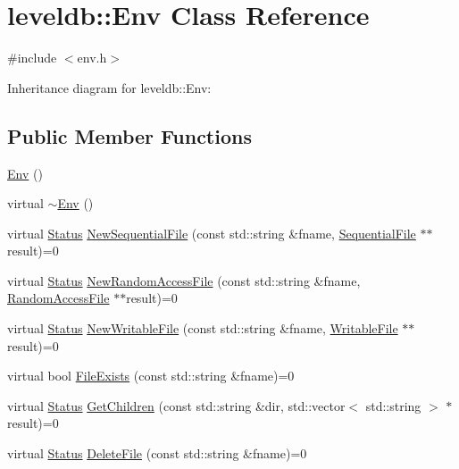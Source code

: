 \hypertarget{classleveldb_1_1_env}{\section{leveldb\-:\-:Env Class Reference}
\label{classleveldb_1_1_env}
}


{\ttfamily \#include $<$env.\-h$>$}



Inheritance diagram for leveldb\-:\-:Env\-:
\subsection*{Public Member Functions}
\begin{DoxyCompactItemize}
\item 
\hyperlink{classleveldb_1_1_env_a90f3648c740e3f5901f5843cd0dd07c4}{Env} ()
\item 
virtual \hyperlink{classleveldb_1_1_env_a2b9321c6176f8824b3ba65f0a36453fe}{$\sim$\-Env} ()
\item 
virtual \hyperlink{classleveldb_1_1_status}{Status} \hyperlink{classleveldb_1_1_env_ad73810059f48c1d7b91125d357e7d351}{New\-Sequential\-File} (const std\-::string \&fname, \hyperlink{classleveldb_1_1_sequential_file}{Sequential\-File} $\ast$$\ast$result)=0
\item 
virtual \hyperlink{classleveldb_1_1_status}{Status} \hyperlink{classleveldb_1_1_env_a1df3e0bb2d47ee914448df9bb9ca0734}{New\-Random\-Access\-File} (const std\-::string \&fname, \hyperlink{classleveldb_1_1_random_access_file}{Random\-Access\-File} $\ast$$\ast$result)=0
\item 
virtual \hyperlink{classleveldb_1_1_status}{Status} \hyperlink{classleveldb_1_1_env_a4566194f3e82fede425fdb5bb355f7de}{New\-Writable\-File} (const std\-::string \&fname, \hyperlink{classleveldb_1_1_writable_file}{Writable\-File} $\ast$$\ast$result)=0
\item 
virtual bool \hyperlink{classleveldb_1_1_env_acbb85047fdf7bf441bd365cfb09f9ecb}{File\-Exists} (const std\-::string \&fname)=0
\item 
virtual \hyperlink{classleveldb_1_1_status}{Status} \hyperlink{classleveldb_1_1_env_a53028e3112d7bb3bf6574ddaab18d6f6}{Get\-Children} (const std\-::string \&dir, std\-::vector$<$ std\-::string $>$ $\ast$result)=0
\item 
virtual \hyperlink{classleveldb_1_1_status}{Status} \hyperlink{classleveldb_1_1_env_ac956b984466d5f09309664177687f9af}{Delete\-File} (const std\-::string \&fname)=0
$$
\end{DoxyCompactItemize}
